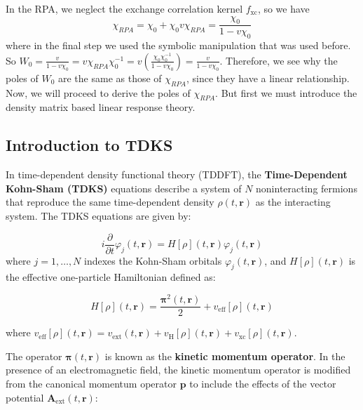In the RPA, we neglect the exchange correlation kernel $f_{\text{xc}}$, so we have
\begin{equation}
    \chi_{RPA} = \chi_0 + \chi_0 v \chi_{RPA} = \frac{\chi_0}{1 - v \chi_0}
\end{equation}
where in the final step we used the symbolic manipulation that was used before. So $W_0 = \frac{v}{1 - v \chi_0} = v\chi_{RPA}\chi_0^{-1} = v\left(\frac{\chi_0 \chi_0^{-1}}{1 - v \chi_0}\right) = \frac{v}{1 - v \chi_0}$. Therefore, we see why the poles of $W_0$ are the same as those of $\chi_{RPA}$, since they have a linear relationship. Now, we will proceed to derive the poles of $\chi_{RPA}$. But first we must introduce the density matrix based linear response theory.

\subsection{Introduction to TDKS}


In time-dependent density functional theory (TDDFT), the \textbf{Time-Dependent Kohn-Sham (TDKS)} equations describe a system of $N$ noninteracting fermions that reproduce the same time-dependent density $\rho(t, \mathbf{r})$ as the interacting system. The TDKS equations are given by:

\begin{equation}
i \frac{\partial}{\partial t} \varphi_{j}(t, \mathbf{r}) = H[\rho](t, \mathbf{r}) \varphi_{j}(t, \mathbf{r}) \label{eq:TDKS}
\end{equation}
where \( j = 1, \ldots, N \) indexes the Kohn-Sham orbitals \( \varphi_{j}(t, \mathbf{r}) \), and \( H[\rho](t, \mathbf{r}) \) is the effective one-particle Hamiltonian defined as:

\begin{equation}
H[\rho](t, \mathbf{r}) = \frac{\boldsymbol{\pi}^2(t, \mathbf{r})}{2} + v_{\text{eff}}[\rho](t, \mathbf{r}) \label{eq:HKohnSham}
\end{equation}

where $v_{\text{eff}}[\rho](t, \mathbf{r}) = v_{\text{ext}}(t, \mathbf{r}) + v_{\text{H}}[\rho](t, \mathbf{r}) + v_{\text{xc}}[\rho](t, \mathbf{r})$.


The operator \( \boldsymbol{\pi}(t, \mathbf{r}) \) is known as the \textbf{kinetic momentum operator}. In the presence of an electromagnetic field, the kinetic momentum operator is modified from the canonical momentum operator \( \mathbf{p} \) to include the effects of the vector potential \( \mathbf{A}_{\text{ext}}(t, \mathbf{r}) \):

